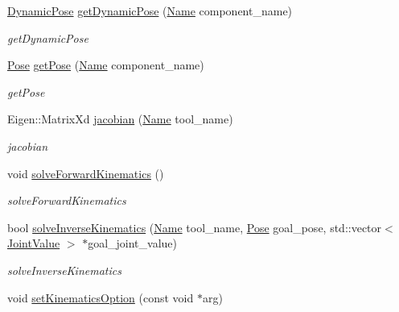 \begin{DoxyCompactItemize}
\hyperlink{structrobotis__manipulator_1_1_dynamic_pose}{Dynamic\+Pose} \hyperlink{classrobotis__manipulator_1_1_robotis_manipulator_a1bcae2a87f1998fc659f02810808f7e3}{get\+Dynamic\+Pose} (\hyperlink{namespacerobotis__manipulator_a08c2d25e77a01ad75b9bb740f8ce4765}{Name} component\+\_\+name)
\begin{DoxyCompactList}\small\item\em get\+Dynamic\+Pose \end{DoxyCompactList}\item 
\hyperlink{structrobotis__manipulator_1_1_pose}{Pose} \hyperlink{classrobotis__manipulator_1_1_robotis_manipulator_a601d652b8eb819eda2356d910e223e62}{get\+Pose} (\hyperlink{namespacerobotis__manipulator_a08c2d25e77a01ad75b9bb740f8ce4765}{Name} component\+\_\+name)
\begin{DoxyCompactList}\small\item\em get\+Pose \end{DoxyCompactList}\item 
Eigen\+::\+Matrix\+Xd \hyperlink{classrobotis__manipulator_1_1_robotis_manipulator_a312cc64ae86dca8432769b10a73efd7c}{jacobian} (\hyperlink{namespacerobotis__manipulator_a08c2d25e77a01ad75b9bb740f8ce4765}{Name} tool\+\_\+name)
\begin{DoxyCompactList}\small\item\em jacobian \end{DoxyCompactList}\item 
void \hyperlink{classrobotis__manipulator_1_1_robotis_manipulator_a023ebba1d20ff9aa840891584d43464b}{solve\+Forward\+Kinematics} ()
\begin{DoxyCompactList}\small\item\em solve\+Forward\+Kinematics \end{DoxyCompactList}\item 
bool \hyperlink{classrobotis__manipulator_1_1_robotis_manipulator_a9a292c755bee7f97f2d8a17b73ce3401}{solve\+Inverse\+Kinematics} (\hyperlink{namespacerobotis__manipulator_a08c2d25e77a01ad75b9bb740f8ce4765}{Name} tool\+\_\+name, \hyperlink{structrobotis__manipulator_1_1_pose}{Pose} goal\+\_\+pose, std\+::vector$<$ \hyperlink{namespacerobotis__manipulator_aa0556c98c5294ccf3a96c2d0fe315e40}{Joint\+Value} $>$ $\ast$goal\+\_\+joint\+\_\+value)
\begin{DoxyCompactList}\small\item\em solve\+Inverse\+Kinematics \end{DoxyCompactList}\item 
void \hyperlink{classrobotis__manipulator_1_1_robotis_manipulator_ad20c00086b950f1148b357fc6883d9fd}{set\+Kinematics\+Option} (const void $\ast$arg)

\end{DoxyCompactItemize}
